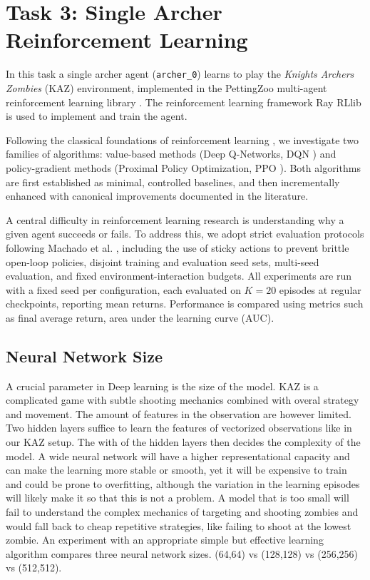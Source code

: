 \section{Task 3: Single Archer Reinforcement Learning}

In this task a single archer agent (\texttt{archer\_0}) learns to play the
\emph{Knights Archers Zombies} (KAZ) environment, implemented in the
PettingZoo multi-agent reinforcement learning library \cite{pettingzoo2020}.
The reinforcement learning framework Ray RLlib \cite{liang2018rllib} is used
to implement and train the agent.

Following the classical foundations of reinforcement learning
\cite{sutton2018reinforcement}, we investigate two families of algorithms:
value-based methods (Deep Q-Networks, DQN \cite{mnih2015human}) and
policy-gradient methods (Proximal Policy Optimization, PPO
\cite{schulman2017proximal}). Both algorithms are first established as
minimal, controlled baselines, and then incrementally enhanced with canonical
improvements documented in the literature. 

A central difficulty in reinforcement learning research is understanding why a
given agent succeeds or fails. To address this, we adopt strict evaluation
protocols following Machado et al. \cite{machado2018revisiting}, including
the use of sticky actions to prevent brittle open-loop policies, disjoint
training and evaluation seed sets, multi-seed evaluation, and fixed
environment-interaction budgets. All experiments are run with a fixed seed per
configuration, each evaluated on $K=20$ episodes at regular checkpoints,
reporting mean returns. Performance is compared using
metrics such as final average return, area under the learning curve (AUC).

\subsection{Neural Network Size}
A crucial parameter in Deep learning is the size of the model. KAZ is a complicated game with subtle shooting mechanics combined with overal strategy and movement. The amount of features in the observation are however limited. Two hidden layers suffice to learn the features of vectorized observations like in our KAZ setup. The with of the hidden layers then decides the complexity of the model. A wide neural network will have a higher representational capacity and can make the learning more stable or smooth, yet it will be expensive to train and could be prone to overfitting, although the variation in the learning episodes will likely make it so that this is not a problem. A model that is too small will fail to understand the complex mechanics of targeting and shooting zombies and would fall back to cheap repetitive strategies, like failing to shoot at the lowest zombie. An experiment with an appropriate simple but effective learning algorithm compares three neural network sizes. (64,64) vs (128,128) vs (256,256) vs (512,512).

